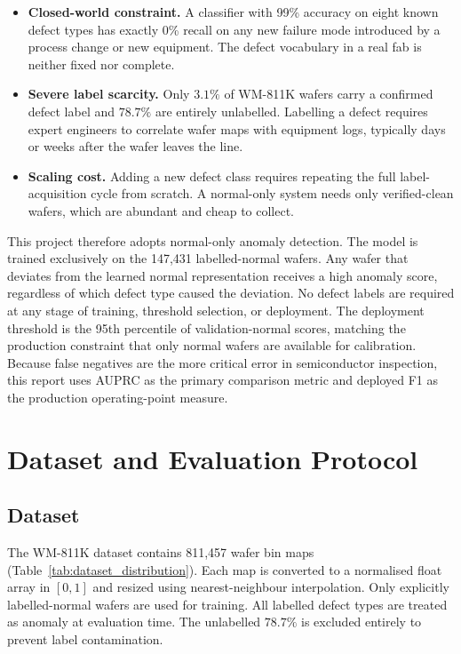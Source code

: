 \documentclass[11pt]{article}
\begin{document}
\begin{itemize}[leftmargin=1.5em]
  \item \textbf{Closed-world constraint.} A classifier with 99\% accuracy on
        eight known defect types has exactly 0\% recall on any new failure mode
        introduced by a process change or new equipment. The defect vocabulary
        in a real fab is neither fixed nor complete.
  \item \textbf{Severe label scarcity.} Only $3.1\%$ of WM-811K wafers carry a
        confirmed defect label and $78.7\%$ are entirely unlabelled. Labelling
        a defect requires expert engineers to correlate wafer maps with equipment
        logs, typically days or weeks after the wafer leaves the line.
  \item \textbf{Scaling cost.} Adding a new defect class requires repeating the
        full label-acquisition cycle from scratch. A normal-only system needs
        only verified-clean wafers, which are abundant and cheap to collect.
\end{itemize}

This project therefore adopts normal-only anomaly detection. The model
is trained exclusively on the 147,431 labelled-normal wafers. Any wafer that
deviates from the learned normal representation receives a high anomaly score,
regardless of which defect type caused the deviation. No defect labels are
required at any stage of training, threshold selection, or deployment. The
deployment threshold is the 95th percentile of validation-normal scores,
matching the production constraint that only normal wafers are available for
calibration. Because false negatives are the more critical error in semiconductor
inspection, this report uses AUPRC as the primary comparison metric and deployed
F1 as the production operating-point measure.

\section{Dataset and Evaluation Protocol}

\subsection{Dataset}

The WM-811K dataset contains 811,457 wafer bin maps (Table~\ref{tab:dataset_distribution}).
Each map is converted to a normalised float array in $[0,1]$ and resized using
nearest-neighbour interpolation. Only explicitly labelled-normal wafers are used
for training. All labelled defect types are treated as anomaly at evaluation time.
The unlabelled $78.7\%$ is excluded entirely to prevent label contamination.
\end{document}

